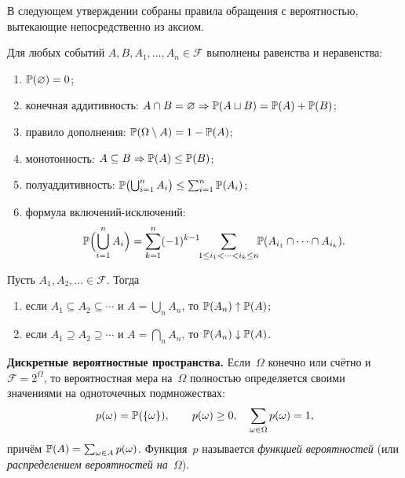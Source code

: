 В следующем утверждении собраны правила обращения с вероятностью, вытекающие непосредственно из аксиом.

\begin{proposition}
\label{prop:prob-elementary}
Для любых событий $A, B, A_1, \dots, A_n \in \mathcal{F}$ выполнены равенства и неравенства:
\begin{enumerate}[label=(\alph*)]
  \item $\mathbb{P}(\varnothing) = 0$;
  \item конечная аддитивность: $A \cap B = \varnothing \Rightarrow \mathbb{P}(A \sqcup B) = \mathbb{P}(A) + \mathbb{P}(B)$;
  \item правило дополнения: $\mathbb{P}(\Omega \setminus A) = 1 - \mathbb{P}(A)$;
  \item монотонность: $A \subseteq B \Rightarrow \mathbb{P}(A) \leq \mathbb{P}(B)$;
  \item полуаддитивность: $\mathbb{P}\bigl(\bigcup_{i=1}^{n} A_i\bigr) \leq \sum_{i=1}^{n} \mathbb{P}(A_i)$;
  \item формула включений-исключений:
        \[
          \mathbb{P}\Bigl(\bigcup_{i=1}^{n} A_i\Bigr) = \sum_{k=1}^{n} (-1)^{k-1} \!\!\sum_{1 \leq i_1 < \cdots < i_k \leq n}\!\! \mathbb{P}(A_{i_1} \cap \cdots \cap A_{i_k}).
        \]
\end{enumerate}
\end{proposition}

\begin{theorem}
\label{thm:prob-continuity}
Пусть $A_1, A_2, \dots \in \mathcal{F}$. Тогда
\begin{enumerate}[label=(\alph*)]
  \item если $A_1 \subseteq A_2 \subseteq \cdots$ и $A = \bigcup_{n} A_n$, то $\mathbb{P}(A_n) \uparrow \mathbb{P}(A)$;
  \item если $A_1 \supseteq A_2 \supseteq \cdots$ и $A = \bigcap_{n} A_n$, то $\mathbb{P}(A_n) \downarrow \mathbb{P}(A)$.
\end{enumerate}
\end{theorem}

\medskip
\noindent\textbf{Дискретные вероятностные пространства.} Если~$\Omega$ конечно или счётно и $\mathcal{F} = 2^{\Omega}$, то вероятностная мера на~$\Omega$ полностью определяется своими значениями на одноточечных подмножествах:
\[
  p(\omega) = \mathbb{P}(\{\omega\}), \qquad p(\omega) \geq 0,\quad \sum_{\omega \in \Omega} p(\omega) = 1,
\]
причём $\mathbb{P}(A) = \sum_{\omega \in A} p(\omega)$. Функция~$p$ называется \emph{функцией вероятностей} (или \emph{распределением вероятностей на~$\Omega$}).

